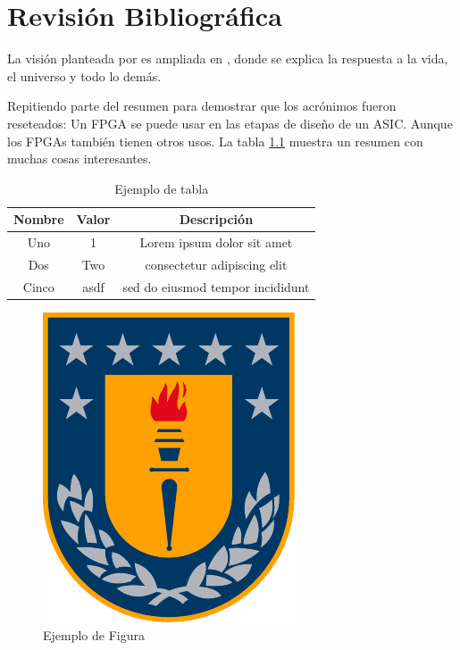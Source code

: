 \chapter{Revisión Bibliográfica}

La visión planteada por \cite{DUMMY:1} es ampliada en \cite{hitchhiker:first}, donde se explica la respuesta a la vida, el universo y todo lo demás.

Repitiendo parte del resumen para demostrar que los acrónimos fueron reseteados: Un \ac{FPGA} se puede usar en las etapas de diseño de un \ac{ASIC}.
Aunque los \acp{FPGA} también tienen otros usos.
La tabla \ref{tab:ejemplo} muestra un resumen con muchas cosas interesantes.


\begin{table}[tb]
	\centering
	\caption{Ejemplo de tabla}
	\label{tab:ejemplo}
	\begin{tabular}{c|c|c}
		Nombre & Valor & Descripción\\
		\hline
		Uno    & 1    & Lorem ipsum dolor sit amet \\
		Dos    & Two  &  consectetur adipiscing elit\\
		Cinco  & asdf & sed do eiusmod tempor incididunt\\
	\end{tabular}
\end{table}


\begin{figure}
\centering
\includegraphics[scale=0.5]{./images/logos/logo_udec}
\caption{Ejemplo de Figura}
\label{fig:ejemplo}
\end{figure}
